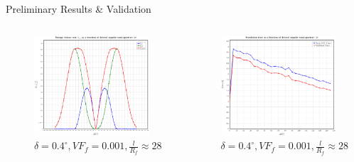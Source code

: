 \documentclass[final]{beamer}
\begin{document}
\begin{frame}
\begin{center}
\begin{minipage}{\textwidth}
\begin{exampleblock}{\rule[-0.6ex]{0pt}{50pt}\centering\LARGE Preliminary Results \& Validation}
\begin{columns}
\begin{column}{0.375\textwidth}
\begin{center}
\captionsetup[subfigure]{labelformat=empty}
\begin{figure}[!h]
\centering
 \includegraphics[width=0.9\columnwidth]{2017-03-03_AbqRunSummary_Gs.pdf}
 \caption{$\delta=0.4^{\circ},VF_{f}=0.001,\frac{l}{R_{f}}\approx28$}
\end{figure}
     \end{center}
\end{column}
\begin{column}{0.375\textwidth}  %
    \begin{center}
\begin{figure}[!h]
\centering
     \includegraphics[width=0.9\columnwidth]{cpus-time.pdf}
 \caption{$\delta=0.4^{\circ},VF_{f}=0.001,\frac{l}{R_{f}}\approx28$}
\end{figure}
     \end{center}
\end{column}
\end{columns}
\end{exampleblock}
\end{minipage}
\end{center}


\end{frame}
\end{document}
